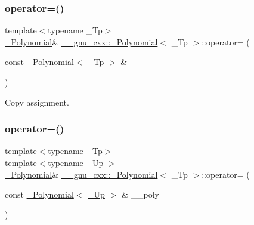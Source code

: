 \subsubsection{\texorpdfstring{operator=()}{operator=()}\hspace{0.1cm}{\footnotesize\ttfamily [2/4]}}
{\footnotesize\ttfamily template$<$typename \+\_\+\+Tp$>$ \\
\hyperlink{class____gnu__cxx_1_1__Polynomial}{\+\_\+\+Polynomial}\& \hyperlink{class____gnu__cxx_1_1__Polynomial}{\+\_\+\+\_\+gnu\+\_\+cxx\+::\+\_\+\+Polynomial}$<$ \+\_\+\+Tp $>$\+::operator= (\begin{DoxyParamCaption}\item[{const \hyperlink{class____gnu__cxx_1_1__Polynomial}{\+\_\+\+Polynomial}$<$ \+\_\+\+Tp $>$ \&}]{ }\end{DoxyParamCaption})\hspace{0.3cm}{\ttfamily [default]}}

Copy assignment. \mbox{\label{class____gnu__cxx_1_1__Polynomial_ab3287f4f0300adc76216e7fabeb62d7d}} 
\subsubsection{\texorpdfstring{operator=()}{operator=()}\hspace{0.1cm}{\footnotesize\ttfamily [3/4]}}
{\footnotesize\ttfamily template$<$typename \+\_\+\+Tp$>$ \\
template$<$typename \+\_\+\+Up $>$ \\
\hyperlink{class____gnu__cxx_1_1__Polynomial}{\+\_\+\+Polynomial}\& \hyperlink{class____gnu__cxx_1_1__Polynomial}{\+\_\+\+\_\+gnu\+\_\+cxx\+::\+\_\+\+Polynomial}$<$ \+\_\+\+Tp $>$\+::operator= (\begin{DoxyParamCaption}\item[{const \hyperlink{class____gnu__cxx_1_1__Polynomial}{\+\_\+\+Polynomial}$<$ \hyperlink{class____gnu__cxx_1_1__Polynomial_a242114d4b86648a5dff67a8221f80d40}{\+\_\+\+Up} $>$ \&}]{\+\_\+\+\_\+poly }\end{DoxyParamCaption})\hspace{0.3cm}{\ttfamily [inline]}}



